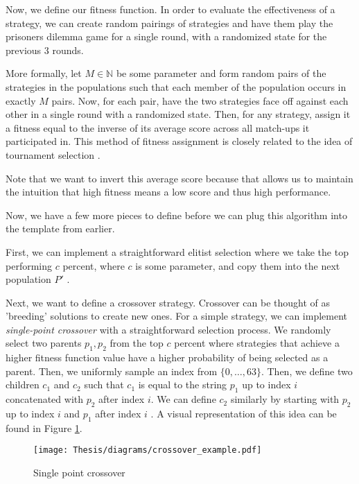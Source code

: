 \documentclass[11pt]{amsart}
\theoremstyle{definition}                  %
\theoremstyle{remark}                       %
\numberwithin{equation}{section}
\begin{document}
Now, we define our fitness function. In order to evaluate the effectiveness of a strategy, we can create random pairings of strategies and have them play the prisoners dilemma game for a single round, with a randomized state for the previous $3$ rounds.

More formally, let $M \in \mathbb{N}$ be some parameter and form random pairs of the strategies in the populations such that each member of the population occurs in exactly $M$ pairs. Now, for each pair, have the two strategies face off against each other in a single round with a randomized state. Then, for any strategy, assign it a fitness equal to the inverse of its average score across all match-ups it participated in. This method of fitness assignment is closely related to the idea of tournament selection \cite{mitchell1998}. 

Note that we want to invert this average score because that allows us to maintain the intuition that high fitness means a low score and thus high performance. 

Now, we have a few more pieces to define before we can plug this algorithm into the template from earlier. 

First, we can implement a straightforward elitist selection where we take the top performing $c$ percent, where $c$ is some parameter, and copy them into the next population $P'$ \cite{mitchell1998}.

Next, we want to define a crossover strategy. Crossover can be thought of as 'breeding' solutions to create new ones. For a simple strategy, we can implement \textit{single-point crossover} with a straightforward selection process. We randomly select two parents $p_1, p_2$ from the top $c$ percent where strategies that achieve a higher fitness function value have a higher probability of being selected as a parent. Then, we uniformly sample an index from $\{0, \ldots, 63\}$. Then, we define two children $c_1$ and $c_2$ such that $c_1$ is equal to the string $p_1$ up to index $i$ concatenated with $p_2$ after index $i$. We can define $c_2$ similarly by starting with $p_2$ up to index $i$ and $p_1$ after index $i$ \cite{holland1992}. A visual representation of this idea can be found in Figure \ref{fig:singlePointCrossover}. 

\begin{figure}[H]
    \centering
    \texttt{[image: Thesis/diagrams/crossover\_example.pdf]}
    \caption{Single point crossover}
    \label{fig:singlePointCrossover}
\end{figure}
\end{document}
